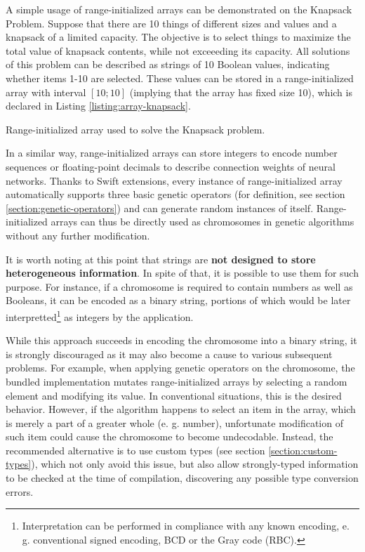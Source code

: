 A simple usage of range-initialized arrays can be demonstrated on the Knapsack Problem. Suppose that there are 10 things of different sizes and values and a knapsack of a limited capacity. The objective is to select things to maximize the total value of knapsack contents, while not exceeeding its capacity. All solutions of this problem can be described as strings of 10 Boolean values, indicating whether items 1-10 are selected. These values can be stored in a range-initialized array with interval $[10;10]$ (implying that the array has fixed size 10), which is declared in Listing \ref{listing:array-knapsack}.

\begin{listing}[ht]
	\caption{Range-initialized array used to solve the Knapsack problem.}
	\label{listing:array-knapsack}
\end{listing}

In a similar way, range-initialized arrays can store integers to encode number sequences or floating-point decimals to describe connection weights of neural networks. Thanks to Swift extensions, every instance of range-initialized array automatically supports three basic genetic operators (for definition, see section \ref{section:genetic-operators}) and can generate random instances of itself. Range-initialized arrays can thus be directly used as chromosomes in genetic algorithms without any further modification.

It is worth noting at this point that strings are \textbf{not designed to store heterogeneous information}. In spite of that, it is possible to use them for such purpose. For instance, if a chromosome is required to contain numbers as well as Booleans, it can be encoded as a binary string, portions of which would be later interpretted\footnote{Interpretation can be performed in compliance with any known encoding, e. g. conventional signed encoding, BCD or the Gray code (RBC).} as integers by the application.

While this approach succeeds in encoding the chromosome into a binary string, it is strongly discouraged as it may also become a cause to various subsequent problems. For example, when applying genetic operators on the chromosome, the bundled implementation mutates range-initialized arrays by selecting a random element and modifying its value. In conventional situations, this is the desired behavior. However, if the algorithm happens to select an item in the array, which is merely a part of a greater whole (e. g. number), unfortunate modification of such item could cause the chromosome to become undecodable. Instead, the recommended alternative is to use custom types (see section \ref{section:custom-types}), which not only avoid this issue, but also allow strongly-typed information to be checked at the time of compilation, discovering any possible type conversion errors.

